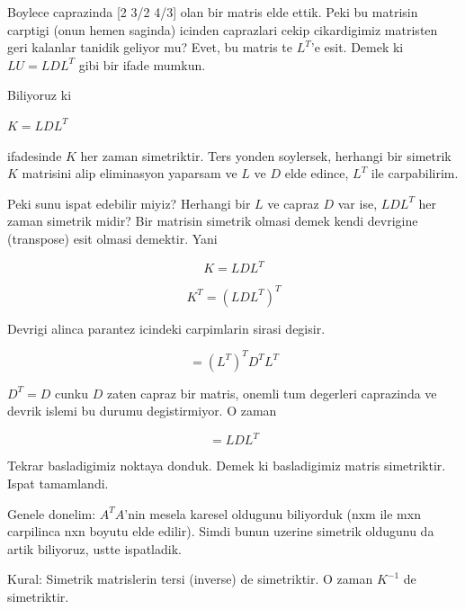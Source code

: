 \documentclass[12pt,fleqn]{article}
\begin{document}
Boylece caprazinda [2 3/2 4/3] olan bir matris elde ettik. Peki bu matrisin
carptigi (onun hemen saginda) icinden caprazlari cekip cikardigimiz
matristen geri kalanlar tanidik geliyor mu? Evet, bu matris te $L^T$'e
esit. Demek ki $LU = LDL^T$ gibi bir ifade mumkun.

Biliyoruz ki 

$K = LDL^T$

ifadesinde $K$ her zaman simetriktir. Ters yonden soylersek, herhangi bir
simetrik $K$ matrisini alip eliminasyon yaparsam ve $L$ ve $D$ elde edince,
$L^T$ ile carpabilirim. 

Peki sunu ispat edebilir miyiz? Herhangi bir $L$ ve capraz $D$ var ise,
$LDL^T$ her zaman simetrik midir? Bir matrisin simetrik olmasi demek
kendi devrigine (transpose) esit olmasi demektir. Yani 

\[ K = LDL^T \]

\[ K^T = (LDL^T)^T \]

Devrigi alinca parantez icindeki carpimlarin sirasi degisir.

\[ = (L^T)^TD^TL^T \]

$D^T = D$ cunku $D$ zaten capraz bir matris, onemli tum degerleri
caprazinda ve devrik islemi bu durumu degistirmiyor. O zaman

\[ = LDL^T \]

Tekrar basladigimiz noktaya donduk. Demek ki basladigimiz matris
simetriktir. Ispat tamamlandi. 

Genele donelim: $A^TA$'nin mesela karesel oldugunu biliyorduk (nxm ile mxn
carpilinca nxn boyutu elde edilir). Simdi bunun uzerine simetrik oldugunu
da artik biliyoruz, ustte ispatladik.

Kural: Simetrik matrislerin tersi (inverse) de simetriktir. O zaman
$K^{-1}$ de simetriktir. 
\end{document}
